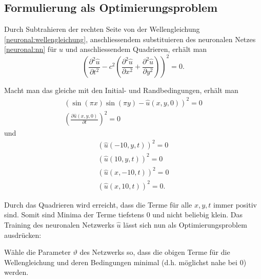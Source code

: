 \subsection{Formulierung als Optimierungsproblem}\label{neuronal:subsection:optimierungsproblem}
Durch Subtrahieren der rechten Seite von der Wellengleichung \eqref{neuronal:wellengleichung}, anschliessendem substituieren des neuronalen Netzes \eqref{neuronal:nn} für \( u \) und anschliessendem Quadrieren, erhält man
\begin{equation}
    \left(\frac{\partial^2 \hat{u}}{\partial t^2} - c^2 \left( \frac{\partial^2 \hat{u}}{\partial x^2} + \frac{\partial^2 \hat{u}}{\partial y^2} \right)\right)^2 = 0.
\end{equation}

Macht man das gleiche mit den Initial- und Randbedingungen, erhält man
\begin{equation}
    \begin{aligned}
        \left(\sin(\pi x) \sin(\pi y) - \hat{u}(x, y, 0)\right)^2 = 0\\
        \left(\frac{\partial \hat{u}(x, y, 0)}{\partial t}\right)^2 = 0
    \end{aligned}
\end{equation}
und
\begin{equation}
    \begin{aligned}
        \left(\hat{u}(-10, y, t)\right)^2 = 0\\
        \left(\hat{u}(10, y, t)\right)^2 = 0\\
        \left(\hat{u}(x, -10, t)\right)^2 = 0\\
        \left(\hat{u}(x, 10, t)\right)^2 = 0.
    \end{aligned}
\end{equation}

Durch das Quadrieren wird erreicht, dass die Terme für alle \( x, y, t \) immer positiv sind.
Somit sind Minima der Terme tiefstens 0 und nicht beliebig klein.
Das Training des neuronalen Netzwerks \( \hat{u} \) lässt sich nun als Optimierungsproblem ausdrücken:

\begin{tcolorbox}[colback=gray!10, colframe=black, boxrule=0.5pt]
Wähle die Parameter \( \vartheta \) des Netzwerks so, dass die obigen Terme für die Wellengleichung und deren Bedingungen minimal (d.h. möglichst nahe bei 0) werden.
\end{tcolorbox}

